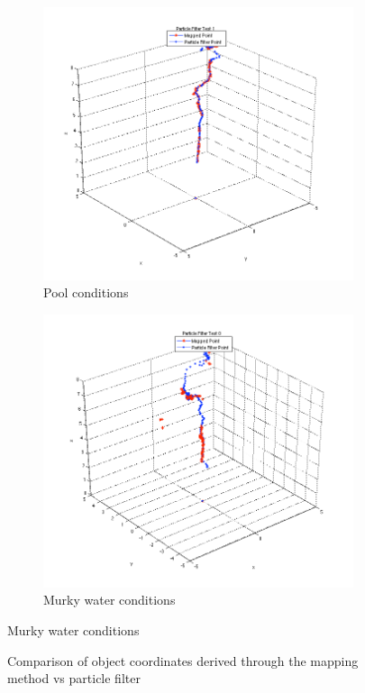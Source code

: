 \documentclass[a4paper]{IEEEtran}
\begin{document}
\begin{figure}%
\centering
\begin{subfigure}{\columnwidth}
\includegraphics[width=\columnwidth]{pfo2}%
\caption{Pool conditions}%
\end{subfigure}\hfill%
\begin{subfigure}{\columnwidth}
\includegraphics[width=\columnwidth]{pfo1}%
\caption{Murky water conditions}%
\label{subfiga}%
\end{subfigure}\hfill%
\end{figure}
\begin{figure}%
\centering
\caption{Comparison of object coordinates derived through the mapping method vs particle filter}
\label{figabc}
\end{figure}
 
\end{document}
